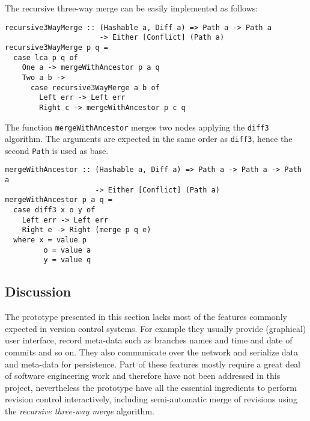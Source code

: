 \documentclass[../Thesis.tex]{subfiles}
\begin{document}
	The recursive three-way merge can be easily implemented as follows:

\begin{verbatim}
recursive3WayMerge :: (Hashable a, Diff a) => Path a -> Path a 
                      -> Either [Conflict] (Path a)
recursive3WayMerge p q = 
  case lca p q of
    One a -> mergeWithAncestor p a q 
    Two a b ->  
      case recursive3WayMerge a b of
        Left err -> Left err 
        Right c -> mergeWithAncestor p c q 
\end{verbatim}

	The function \texttt{mergeWithAncestor} merges two
	nodes applying the \texttt{diff3} algorithm. The arguments
	are expected in the same order as \texttt{diff3}, hence the second 
	\texttt{Path} is used as base.

\begin{verbatim}	
mergeWithAncestor :: (Hashable a, Diff a) => Path a -> Path a -> Path a 
                     -> Either [Conflict] (Path a)
mergeWithAncestor p a q = 
  case diff3 x o y of
    Left err -> Left err 
    Right e -> Right (merge p q e)
  where x = value p
         o = value a
         y = value q
\end{verbatim}
	
	\subsection{Discussion}
	The prototype presented in this section lacks most of the
	features commonly expected in version control systems.
	For example they usually provide (graphical) user interface, 
	record meta-data 
	such as branches names and time and date of 
	commits and so on. They also communicate over the 
	network and serialize data and meta-data for persistence.
	Part of these features mostly require a great deal of 
	software engineering work and therefore have not
	been addressed in this project,
	nevertheless the prototype have all the essential ingredients
	to perform revision control interactively, including
	semi-automatic merge of revisions using the \emph{recursive three-way
	merge} algorithm.
	
\end{document}
